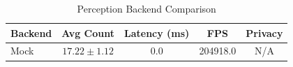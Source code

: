 \begin{table}[t]
\centering
\caption{Perception Backend Comparison}
\label{tab:backend-comparison}
\begin{tabular}{lcccc}
\toprule
\textbf{Backend} & \textbf{Avg Count} & \textbf{Latency (ms)} & \textbf{FPS} & \textbf{Privacy} \\
\midrule
        Mock & $17.22 \pm 1.12$ & 0.0 & 204918.0 & N/A \\
\bottomrule
\end{tabular}
\end{table}
